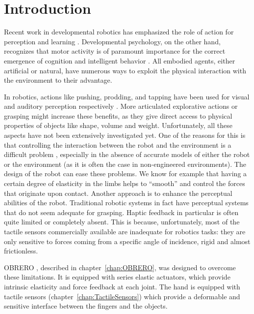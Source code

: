 

%
\section{Introduction}
%
Recent work in developmental robotics has emphasized the role of
action for perception and learning
\cite{metta03early,natale04learning,natale05from}. Developmental
psychology, on the other hand, recognizes that motor activity is
of paramount importance for the correct emergence of cognition and
intelligent behavior
\cite{gibson88explore,streri93Seeing,bushnell93motor,hofsten04motor}.
All embodied agents, either artificial or natural, have numerous
ways to exploit the physical interaction with the environment to
their advantage.

In robotics, actions like pushing, prodding, and tapping have been
used for visual and auditory perception respectively
\cite{metta03early,etorresjara05tapping}. More articulated
explorative actions or grasping might increase these benefits, as
they give direct access to physical properties of objects like
shape, volume and weight.
%
Unfortunately, all these aspects have not been extensively
investigated yet. One of the reasons for this is that controlling
the interaction between the robot and the environment is a
difficult problem \cite{volpe90real}, especially in the absence of
accurate models of either the robot or the environment (as it is
often the case in non-engineered environments).
%
The design of the robot can ease these problems. We know for
example that having a certain degree of elasticity in the limbs
helps to ``smooth''  and control the forces that originate upon
contact. Another approach is to enhance the perceptual abilities
of the robot. Traditional robotic systems in fact have perceptual
systems that do not seem adequate for grasping. Haptic feedback in
particular is often quite limited or completely absent. This is
because, unfortunately, most of the tactile sensors commercially
available are inadequate for robotics tasks: they are only
sensitive to forces coming from a specific angle of incidence,
rigid and almost frictionless.

OBRERO \cite{obrero}, described in chapter~\ref{chap:OBRERO}, was
designed to overcome these limitations. It is equipped with series
elastic actuators, which provide intrinsic elasticity and force
feedback at each joint. The hand is equipped with tactile sensors
(chapter~\ref{chap:TactileSensors}) which provide a deformable and
sensitive interface between the fingers and the objects.

